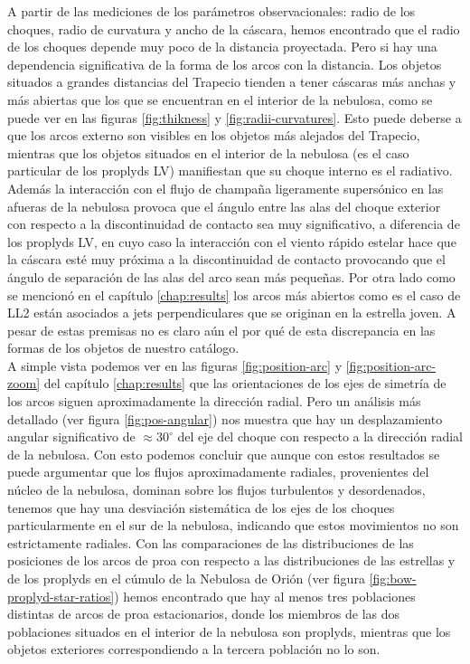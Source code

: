 A partir de las mediciones de los parámetros observacionales: radio de los choques, radio de curvatura y ancho de la cáscara, hemos encontrado que el radio de los choques depende muy poco de la distancia proyectada. Pero si hay una dependencia significativa de la forma de los arcos con la distancia. Los objetos situados a grandes distancias del Trapecio tienden a tener cáscaras más anchas y más abiertas que los que se encuentran en el interior de la nebulosa, como se puede ver en las figuras \ref{fig:thikness} y \ref{fig:radii-curvatures}. Esto puede deberse a que los arcos externo son visibles en los objetos más alejados del Trapecio, mientras que los objetos situados en el interior de la nebulosa (es el caso particular de los proplyds LV) manifiestan que su choque interno es el radiativo. Además la interacción con el flujo de champaña ligeramente supersónico en las afueras de la nebulosa provoca que el ángulo entre las alas del choque exterior con respecto a la discontinuidad de contacto sea muy significativo, a diferencia de los proplyds LV, en cuyo caso la interacción con el  viento rápido estelar hace que la cáscara esté muy próxima a la discontinuidad de contacto provocando que el ángulo de separación de las alas del arco sean más pequeñas. Por otra lado como se mencionó en el capítulo \ref{chap:results} los arcos más abiertos como es el caso de LL2 están asociados a jets perpendiculares que se originan en la estrella joven. A pesar de estas premisas no es claro aún el por qué de esta discrepancia en las formas de los objetos de nuestro catálogo. \\  

A simple vista podemos ver en las figuras \ref{fig:position-arc} y \ref{fig:position-arc-zoom} del capítulo \ref{chap:results} que las orientaciones de los ejes de simetría de los arcos siguen aproximadamente la dirección radial. Pero un análisis más detallado (ver figura \ref{fig:pos-angular}) nos muestra que hay un desplazamiento angular significativo de \(\approx 30^{\circ}\) del eje del choque con respecto a la dirección radial de la nebulosa. Con esto podemos concluir que aunque con estos resultados se puede argumentar que los flujos aproximadamente radiales, provenientes del núcleo de la nebulosa, dominan sobre los flujos turbulentos y desordenados, tenemos que hay una desviación sistemática de los ejes de los choques particularmente en el sur de la nebulosa, indicando que estos movimientos no son estrictamente radiales. Con las comparaciones de las distribuciones de las posiciones de los arcos de proa con respecto a las distribuciones de las estrellas y de los proplyds en el cúmulo de la Nebulosa de Orión (ver figura \ref{fig:bow-proplyd-star-ratios}) hemos encontrado que hay al menos tres poblaciones distintas de arcos de proa estacionarios, donde los miembros de las dos poblaciones situados en el interior de la nebulosa son proplyds, mientras que los objetos exteriores correspondiendo a la tercera población no lo son.\\      


